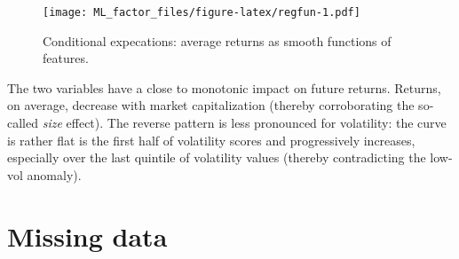 \documentclass[]{krantz}
\makeatletter
\newenvironment{Shaded}{\begin{snugshade}}{\end{snugshade}}
\newcommand{\CommentTok}[1]{\textcolor[rgb]{0.37,0.37,0.37}{\textit{#1}}}
\newcommand{\DataTypeTok}[1]{\textcolor[rgb]{0.27,0.27,0.27}{#1}}
\newcommand{\DecValTok}[1]{\textcolor[rgb]{0.06,0.06,0.06}{#1}}
\newcommand{\KeywordTok}[1]{\textcolor[rgb]{0.27,0.27,0.27}{\textbf{#1}}}
\newcommand{\NormalTok}[1]{#1}
\newcommand{\OperatorTok}[1]{\textcolor[rgb]{0.43,0.43,0.43}{\textbf{#1}}}
\newcommand{\StringTok}[1]{\textcolor[rgb]{0.5,0.5,0.5}{#1}}
\newenvironment{kframe}{%
\medskip{}
\setlength{\fboxsep}{.8em}
 \def\at@end@of@kframe{}%
 \ifinner\ifhmode%
  \def\at@end@of@kframe{\end{minipage}}%
  \begin{minipage}{\columnwidth}%
 \fi\fi%
 \def\FrameCommand##1{\hskip\@totalleftmargin \hskip-\fboxsep
 \colorbox{shadecolor}{##1}\hskip-\fboxsep
     \hskip-\linewidth \hskip-\@totalleftmargin \hskip\columnwidth}%
 \MakeFramed {\advance\hsize-\width
   \@totalleftmargin\z@ \linewidth\hsize
   \@setminipage}}%
 {\par\unskip\endMakeFramed%
 \at@end@of@kframe}
\renewenvironment{Shaded}{\begin{kframe}}{\end{kframe}}
\theoremstyle{definition}
\theoremstyle{definition}
\theoremstyle{definition}
\theoremstyle{remark}
\makeatother
\begin{document}
\footnotesize

\begin{Shaded}
\end{Shaded}

\begin{figure}
\centering
\texttt{[image: ML\_factor\_files/figure-latex/regfun-1.pdf]}
\caption{\label{fig:regfun}Conditional expecations: average returns as
smooth functions of features.}
\end{figure}

\normalsize

The two variables have a close to monotonic impact on future returns.
Returns, on average, decrease with market capitalization (thereby
corroborating the so-called \emph{size} effect). The reverse pattern is
less pronounced for volatility: the curve is rather flat is the first
half of volatility scores and progressively increases, especially over
the last quintile of volatility values (thereby contradicting the
low-vol anomaly).

\hypertarget{missing-data}{%
\section{Missing data}\label{missing-data}}
\end{document}

